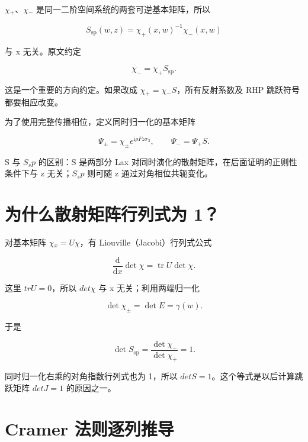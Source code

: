 $\chi{}_{+}$、$\chi{}_{-}$ 是同一二阶空间系统的两套可逆基本矩阵，所以\par

\[
S_{\mathrm{sp}}(w,z)=\chi_+(x,w)^{-1}\chi_-(x,w)
\]

与 x 无关。原文约定\par

\[
\chi_-=\chi_+S_{\mathrm{sp}}.
\]

这是一个重要的方向约定。如果改成 $\chi{}_{+}=\chi{}_{-}S$，所有反射系数及 RHP 跳跃符号都要相应改变。\par

为了使用完整传播相位，定义同时归一化的基本矩阵\par

\[
\Psi_\pm=\chi_\pm e^{\mathrm{i}\rho Fz\sigma_3},
\qquad
\Psi_-=\Psi_+S.
\]

S 与 $S_sp$ 的区别：S 是两部分 Lax 对同时演化的散射矩阵，在后面证明的正则性条件下与 z 无关；$S_sp$ 则可随 z 通过对角相位共轭变化。\par

\section{为什么散射矩阵行列式为 1？}
\par

对基本矩阵 $\chi{}_{x}=U\chi{}$，有 Liouville（Jacobi）行列式公式\par

\[
\dfrac{\mathrm{d}}{\mathrm{d}x}\det\chi
=\operatorname{tr}U\det\chi.
\]

这里 $tr U=0$，所以 $det\chi{}$ 与 x 无关；利用两端归一化\par

\[
\det\chi_\pm=\det E=\gamma(w).
\]

于是\par

\[
\det S_{\mathrm{sp}}
=\dfrac{\det\chi_-}{\det\chi_+}=1.
\]

同时归一化右乘的对角指数行列式也为 1，所以 $detS=1$。这个等式是以后计算跳跃矩阵 $detJ=1$ 的原因之一。\par

\section{Cramer 法则逐列推导}
\par

